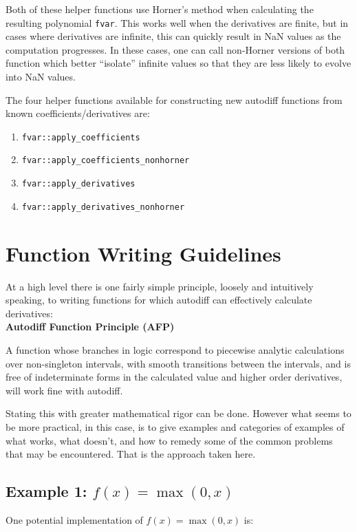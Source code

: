 \documentclass{article}
\begin{document}
Both of these helper functions use Horner's method when calculating the resulting polynomial {\tt fvar}. This works
well when the derivatives are finite, but in cases where derivatives are infinite, this can quickly result in NaN
values as the computation progresses. In these cases, one can call non-Horner versions of both function which
better ``isolate'' infinite values so that they are less likely to evolve into NaN values.

The four helper functions available for constructing new autodiff functions from known coefficients/derivatives are:
\begin{enumerate}
\item {\tt fvar::apply\_coefficients}
\item {\tt fvar::apply\_coefficients\_nonhorner}
\item {\tt fvar::apply\_derivatives}
\item {\tt fvar::apply\_derivatives\_nonhorner}
\end{enumerate}

\section{Function Writing Guidelines}

At a high level there is one fairly simple principle, loosely and intuitively speaking, to writing functions for
which autodiff can effectively calculate derivatives: \\

{\bf Autodiff Function Principle (AFP)}
\begin{displayquote}
A function whose branches in logic correspond to piecewise analytic calculations over non-singleton intervals,
with smooth transitions between the intervals, and is free of indeterminate forms in the calculated value and
higher order derivatives, will work fine with autodiff.
\end{displayquote}
Stating this with greater mathematical rigor can be done. However what seems to be more practical, in this
case, is to give examples and categories of examples of what works, what doesn't, and how to remedy some of the
common problems that may be encountered. That is the approach taken here.

\subsection{Example 1: $f(x)=\max(0,x)$}

One potential implementation of $f(x)=\max(0,x)$ is:
\end{document}
